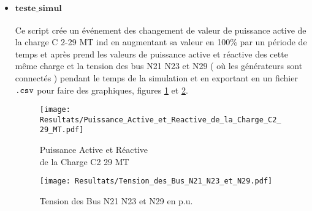 \begin{itemize}
\begin{itemize}
\end{itemize}
\item $\mathbf{teste\_simul}$\\
\\Ce script crée un événement des changement de valeur de puissance active de la charge C 2-29 MT ind en augmentant sa valeur en 100\% par un période de temps et après prend les valeurs de puissance active et réactive des cette même charge et la tension des bus N21 N23 et N29 ( où les générateurs sont connectés ) pendant le temps de la simulation et en exportant en un fichier $ \verb|.csv| $ pour faire des graphiques, figures \ref{fig:Puissance_Active_et_Reactive_de_la_Charge_C2_29_MT} et \ref{fig:Tension_des_Bus_N21_N23_et_N29}.\\
\begin{minipage}{.5\textwidth}
	\begin{figure}[H]
		\begin{center}
			\captionsetup{justification=centering,margin=.5cm}	
			\texttt{[image: Resultats/Puissance\_Active\_et\_Reactive\_de\_la\_Charge\_C2\_29\_MT.pdf]}
			\caption{Puissance Active et Réactive \\de la Charge C2 29 MT}
			\label{fig:Puissance_Active_et_Reactive_de_la_Charge_C2_29_MT}
		\end{center}
	\end{figure}
\end{minipage}

\begin{minipage}{.5\textwidth}
	\begin{figure}[H]
		\begin{center}
			\captionsetup{justification=centering,margin=.5cm}	
			\texttt{[image: Resultats/Tension\_des\_Bus\_N21\_N23\_et\_N29.pdf]}
			\caption{Tension des Bus N21 N23 et N29 en p.u.}
			\label{fig:Tension_des_Bus_N21_N23_et_N29}
		\end{center}
	\end{figure}
\end{minipage}
\end{itemize}